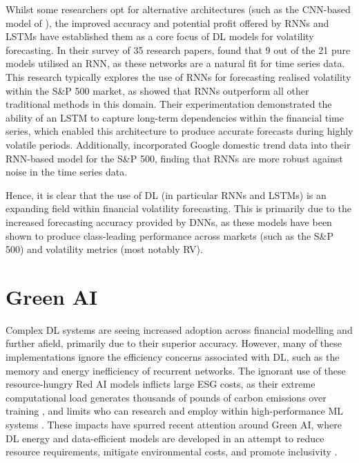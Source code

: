 \documentclass[a4paper, 11pt]{report}
\begin{document}
    Whilst some researchers opt for alternative architectures (such as the CNN-based model of \citet{chen-2018}), the improved accuracy and potential profit offered by RNNs and LSTMs have established them as a core focus of DL models for volatility forecasting. In their survey of 35 research papers, \citet{ge-2022} found that 9 out of the 21 pure models utilised an RNN, as these networks are a natural fit for time series data. This research typically explores the use of RNNs for forecasting realised volatility within the S\&P 500 market, as \citet{bucci-2020} showed that RNNs outperform all other traditional methods in this domain. Their experimentation demonstrated the ability of an LSTM to capture long-term dependencies within the financial time series, which enabled this architecture to produce accurate forecasts during highly volatile periods. Additionally, \citet{xiong-2016} incorporated Google domestic trend data into their RNN-based model for the S\&P 500, finding that RNNs are more robust against noise in the time series data.

    Hence, it is clear that the use of DL (in particular RNNs and LSTMs) is an expanding field within financial volatility forecasting. This is primarily due to the increased forecasting accuracy provided by DNNs, as these models have been shown to produce class-leading performance across markets (such as the S\&P 500) and volatility metrics (most notably RV). 


    \section{Green AI}

    Complex DL systems are seeing increased adoption across financial modelling and further afield, primarily due to their superior accuracy. However, many of these implementations ignore the efficiency concerns associated with DL, such as the memory and energy inefficiency of recurrent networks. The ignorant use of these resource-hungry Red AI models inflicts large ESG costs, as their extreme computational load generates thousands of pounds of carbon emissions over training \citep{strubell-2019}, and limits who can research and employ within high-performance ML systems \citep{bender-2021}. These impacts have spurred recent attention around Green AI, where DL energy and data-efficient models are developed in an attempt to reduce resource requirements, mitigate environmental costs, and promote inclusivity \citep{schwartz-2019}.
\end{document}
